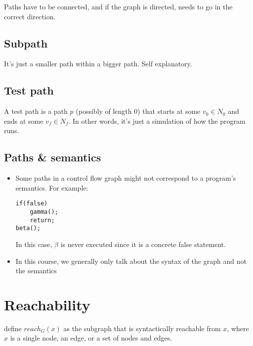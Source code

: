 \documentclass[12pt]{book}
\begin{document}
Paths have to be connected, and if the graph is directed, needs to go in the correct direction.

\subsection{Subpath}
It's just a smaller path within a bigger path. Self explanatory.

\subsection{Test path}

A test path is a path $p$ (possibly of length 0) that starts at some $v_0\in N_0$ and ends at some $v_f \in N_f$. In other words, it's just a simulation of how the program runs.

\subsection{Paths \& semantics}
\begin{itemize}
  \item Some paths in a control flow graph might not correspond to a program's semantics. For example:

  \begin{lstlisting}
if(false)
    gamma();
    return;
beta();
  \end{lstlisting}
  In this case, $\beta$ is never executed since it is a concrete false statement.

  \item In this course, we generally only talk about the syntax of the graph and not the semantics

\end{itemize}

\section{Reachability}
define $reach_G(x)$ as the subgraph that is syntactically reachable from $x$, where $x$ is a single node, an edge, or a set of nodes and edges.
\end{document}
